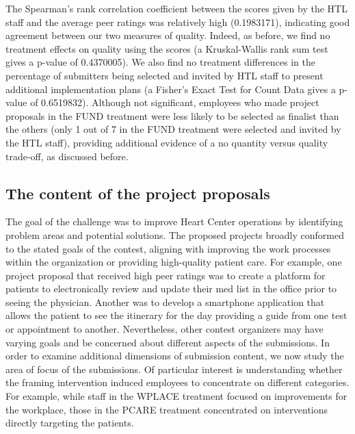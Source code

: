 \documentclass[11pt, titlepage]{article}
\begin{document}
The Spearman's rank correlation coefficient between the scores given by
the HTL staff and the average peer ratings was relatively high
(0.1983171), indicating good agreement between our two measures of
quality. Indeed, as before, we find no treatment effects on quality
using the scores (a Kruskal-Wallis rank sum test gives a p-value of
0.4370005). We also find no treatment differences in the percentage of
submitters being selected and invited by HTL staff to present additional
implementation plans (a Fisher's Exact Test for Count Data gives a
p-value of 0.6519832). Although not significant, employees who made
project proposals in the FUND treatment were less likely to be selected
as finalist than the others (only 1 out of 7 in the FUND treatment were
selected and invited by the HTL staff), providing additional evidence of
a no quantity versus quality trade-off, as discussed before.

\subsection{The content of the project
proposals}\label{the-content-of-the-project-proposals}

The goal of the challenge was to improve Heart Center operations by
identifying problem areas and potential solutions. The proposed projects
broadly conformed to the stated goals of the contest, aligning with
improving the work processes within the organization or providing
high-quality patient care. For example, one project proposal that
received high peer ratings was to create a platform for patients to
electronically review and update their med list in the office prior to
seeing the physician. Another was to develop a smartphone application
that allows the patient to see the itinerary for the day providing a
guide from one test or appointment to another. Nevertheless, other
contest organizers may have varying goals and be concerned about
different aspects of the submissions. In order to examine additional
dimensions of submission content, we now study the area of focus of the
submissions. Of particular interest is understanding whether the framing
intervention induced employees to concentrate on different categories.
For example, while staff in the WPLACE treatment focused on improvements
for the workplace, those in the PCARE treatment concentrated on
interventions directly targeting the patients.
\end{document}
